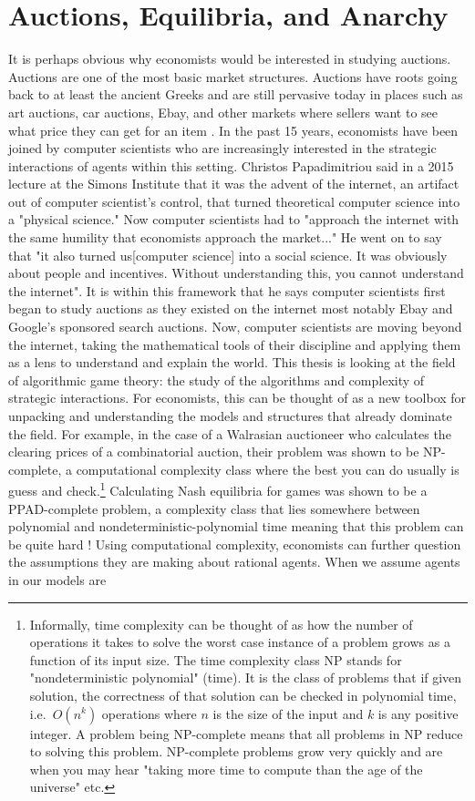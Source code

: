 \documentclass[12pt,twoside]{reedthesis}
\begin{document}
\section{Auctions, Equilibria, and Anarchy}
It is perhaps obvious why economists would be interested in studying auctions. Auctions are one of the most basic market structures. Auctions have roots going back to at least the ancient Greeks and are still pervasive today in places such as art auctions, car auctions, Ebay, and other markets where sellers want to see what price they can get for an item \citep{Mochon2015}. In the past 15 years, economists have been joined by computer scientists who are increasingly interested in the strategic interactions of agents within this setting. Christos Papadimitriou said in a 2015 lecture at the Simons Institute that it was the advent of the internet, an artifact out of computer scientist's control, that turned theoretical computer science into a "physical science." Now computer scientists had to "approach the internet with the same humility that economists approach the market..." He went on to say that "it also turned us[computer science] into a social science. It was obviously about people and incentives. Without understanding this, you cannot understand the internet"\citep{Papadimitriou2015}. It is within this framework that he says computer scientists first began to study auctions as they existed on the internet most notably Ebay and Google's sponsored search auctions. Now, computer scientists are moving beyond the internet, taking the mathematical tools of their discipline and applying them as a lens to understand and explain the world. This thesis is looking at the field of algorithmic game theory: the study of the algorithms and complexity of strategic interactions. For economists, this can be thought of as a new toolbox for unpacking and understanding the models and structures that already dominate the field. For example, in the case of a Walrasian auctioneer who calculates the clearing prices of a combinatorial auction, their problem was shown to be NP-complete, a computational complexity class where the best you can do usually is guess and check.\footnote{Informally, time complexity can be thought of as how the number of operations it takes to solve the worst case instance of a problem grows as a function of its input size. The time complexity class NP stands for "nondeterministic polynomial" (time). It is the class of problems that if given solution, the correctness of that solution can be checked in polynomial time, i.e.~$O(n^k)$ operations where $n$ is the size of the input and $k$ is any positive integer. A problem being NP-complete means that all problems in NP reduce to solving this problem. NP-complete problems grow very quickly and are when you may hear "taking more time to compute than the age of the universe" etc.} Calculating Nash equilibria for games was shown to be a PPAD-complete problem, a complexity class that lies somewhere between polynomial and nondeterministic-polynomial time meaning that this problem can be quite hard \citep{Papadimitriou2015}! Using computational complexity, economists can further question the assumptions they are making about rational agents. When we assume agents in our models are 
\end{document}
